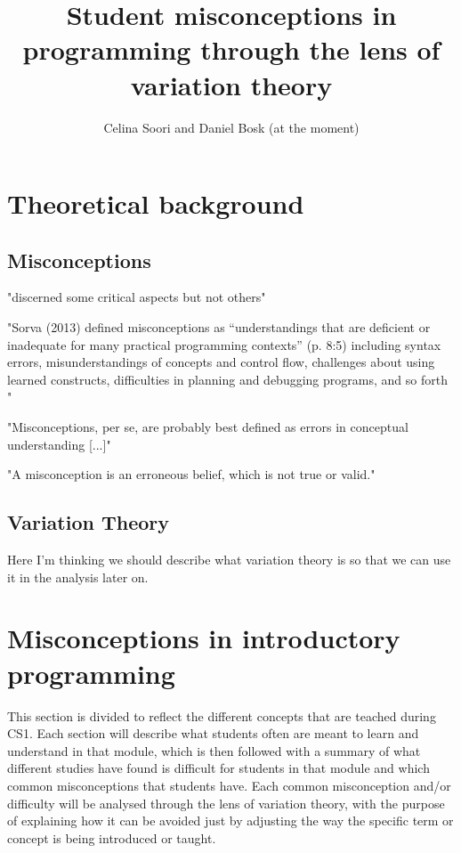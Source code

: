 \documentclass[onecolumn]{article}
\title{Student misconceptions in programming through the lens of variation 
theory}
\author{Celina Soori and Daniel Bosk (at the moment)}
\begin{document}
\maketitle
\newpage
\tableofcontents
\newpage




\section{Theoretical background}

\subsection{Misconceptions}

"discerned some critical aspects but not others" \parencite{NCOL}

"Sorva (2013) defined misconceptions as “understandings that are deficient or 
inadequate for many practical programming contexts” (p. 8:5) including syntax 
errors, misunderstandings of concepts and control flow, challenges about 
using learned constructs, difficulties in planning and debugging programs, 
and so forth
" \parencite{MisconceptionsSurvey2017}

"Misconceptions, per se, are probably best defined as errors in conceptual 
understanding [...]" \parencite{MisconceptionsSurvey2017}

"A misconception is an erroneous belief, which is not true or valid." 
\parencite{KumarVeerasamy2016}

\subsection{Variation Theory}

Here I'm thinking we should describe what variation theory is so that we can 
use it in the analysis later on.







\section{Misconceptions in introductory programming}
\label{misconceptions}

This section is divided to reflect the different concepts that are teached 
during CS1. Each section will describe what students often are meant to learn 
and 
understand in that module, which is then followed with a summary of what 
different studies have found is difficult for students in that module and 
which common 
misconceptions that students have. Each common misconception and/or 
difficulty will be analysed through the lens of variation theory, with the 
purpose of 
explaining how it can be avoided just by adjusting the way the specific term 
or concept is being introduced or taught. 
\end{document}
